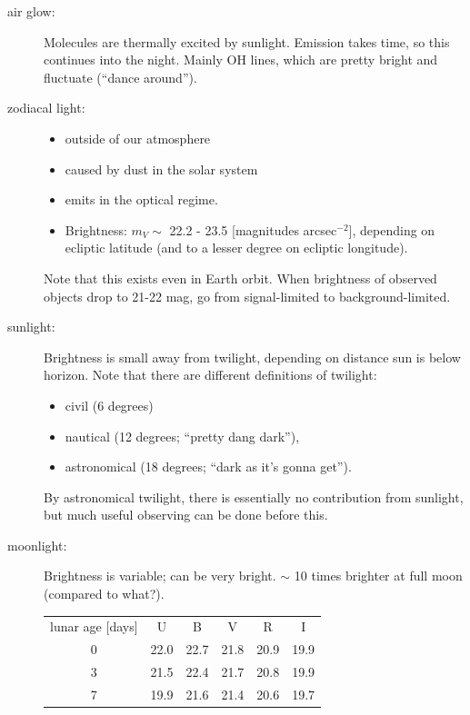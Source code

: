 \documentclass[12pt]{article}
\begin{document}
\begin{description}
    \item [air glow:] Molecules are thermally excited by sunlight.
        Emission takes time, so this continues into the night.
        Mainly OH lines, which are pretty bright and fluctuate (``dance around'').
    \item [zodiacal light:]
        \begin{itemize}
            \item outside of our atmosphere
            \item caused by dust in the solar system
            \item emits in the optical regime.
            \item  Brightness: $m_{V} \sim$ 22.2 - 23.5
                [magnitudes arcsec$^{-2}$], depending on
                ecliptic latitude (and to a lesser degree on ecliptic longitude).
        \end{itemize}
        Note that this exists even in Earth orbit. When brightness of observed
        objects drop to 21-22 mag, go from signal-limited to
        background-limited.
    \item [sunlight:] Brightness is
        small away from twilight, depending on distance sun is below horizon.
        Note that there are different definitions of twilight:
        \begin{itemize}
            \item civil (6 degrees)
            \item nautical (12 degrees; ``pretty dang dark''),
            \item astronomical (18 degrees; ``dark as it's gonna get'').
        \end{itemize}
        By astronomical twilight, there is essentially no contribution
        from sunlight, but much useful observing can be done before this.
    \item [moonlight:] Brightness is variable; can be very bright.
        $\sim$ 10 times brighter at full moon (compared to what?).
        \begin{center}
            \begin{tabular}{c c c c c c}
                lunar age [days] & U & B & V & R & I\\
                0 & 22.0 & 22.7 & 21.8 & 20.9 & 19.9\\
                3 & 21.5 & 22.4 & 21.7 & 20.8 & 19.9\\
                7 & 19.9 & 21.6 & 21.4 & 20.6 & 19.7\\

\end{tabular}
\end{center}
\end{description}
\end{document}
